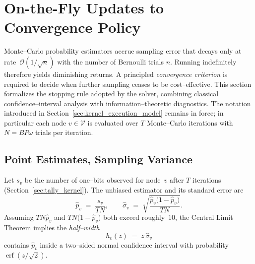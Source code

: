 \chapter{On-the-Fly Updates to Convergence Policy}
\label{sec:convergence_criterion}

Monte--Carlo probability estimators accrue sampling error that decays only at
rate~$\mathcal{O}(1/\sqrt{n})$ with the number of Bernoulli trials $n$.
Running indefinitely therefore yields diminishing returns.
A principled \emph{convergence criterion} is required to decide when further
sampling ceases to be cost--effective.  This section formalizes the stopping
rule adopted by the solver, combining classical confidence--interval analysis
with information--theoretic diagnostics.  The notation introduced in
Section~\ref{sec:kernel_execution_model} remains in force; in particular each
node $v\!\in\!\mathcal{V}$ is evaluated over $T$ Monte--Carlo iterations with
$N\!=\!B P \omega$ trials per iteration.

\section{Point Estimates, Sampling Variance}
\label{subsec:conv_point_estimates}

Let $s_v$ be the number of one--bits observed for node~$v$ after $T$ iterations
(Section~\ref{sec:tally_kernel}).  The unbiased estimator and its standard
error are
\begin{equation}
  \widehat{p}_v \;=\; \frac{s_v}{T N},
  \qquad
  \widehat{\sigma}_v \;=\;
  \sqrt{\frac{\widehat{p}_v\bigl(1-\widehat{p}_v\bigr)}{T N}}.
  \label{eq:p_hat_sigma_hat}
\end{equation}
Assuming $T N \widehat{p}_v$ and $T N\bigl(1-\widehat{p}_v\bigr)$ both exceed
roughly~$10$, the Central Limit Theorem implies the \emph{half--width}
\begin{equation}
  h_v(z) \;=\; z\,\widehat{\sigma}_v
  \label{eq:half_width}
\end{equation}
contains $\widehat{p}_v$ inside a two--sided normal confidence interval with
probability $\operatorname{erf}(z/\sqrt{2})$.

